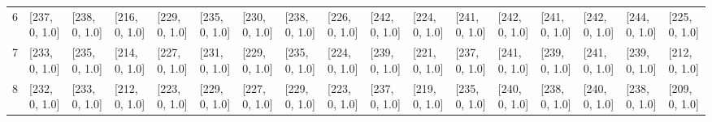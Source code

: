 \begin{tabular}{lllllllllllllllll}
6    &  [237, 0, 1.0] &  [238, 0, 1.0] &  [216, 0, 1.0] &  [229, 0, 1.0] &  [235, 0, 1.0] &  [230, 0, 1.0] &  [238, 0, 1.0] &  [226, 0, 1.0] &  [242, 0, 1.0] &  [224, 0, 1.0] &  [241, 0, 1.0] &  [242, 0, 1.0] &  [241, 0, 1.0] &  [242, 0, 1.0] &    [244, 0, 1.0] &  [225, 0, 1.0] \\
7    &  [233, 0, 1.0] &  [235, 0, 1.0] &  [214, 0, 1.0] &  [227, 0, 1.0] &  [231, 0, 1.0] &  [229, 0, 1.0] &  [235, 0, 1.0] &  [224, 0, 1.0] &  [239, 0, 1.0] &  [221, 0, 1.0] &  [237, 0, 1.0] &  [241, 0, 1.0] &  [239, 0, 1.0] &  [241, 0, 1.0] &    [239, 0, 1.0] &  [212, 0, 1.0] \\
8    &  [232, 0, 1.0] &  [233, 0, 1.0] &  [212, 0, 1.0] &  [223, 0, 1.0] &  [229, 0, 1.0] &  [227, 0, 1.0] &  [229, 0, 1.0] &  [223, 0, 1.0] &  [237, 0, 1.0] &  [219, 0, 1.0] &  [235, 0, 1.0] &  [240, 0, 1.0] &  [238, 0, 1.0] &  [240, 0, 1.0] &    [238, 0, 1.0] &  [209, 0, 1.0] \\
\bottomrule
\end{tabular}
